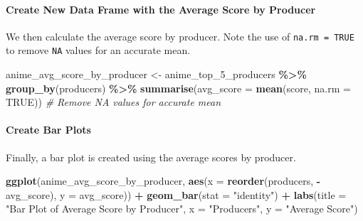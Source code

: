 \documentclass[
  b5paper]{book}
\newenvironment{Shaded}{\begin{snugshade}}{\end{snugshade}}
\newcommand{\AttributeTok}[1]{\textcolor[rgb]{0.13,0.29,0.53}{#1}}
\newcommand{\CommentTok}[1]{\textcolor[rgb]{0.56,0.35,0.01}{\textit{#1}}}
\newcommand{\ConstantTok}[1]{\textcolor[rgb]{0.56,0.35,0.01}{#1}}
\newcommand{\FunctionTok}[1]{\textcolor[rgb]{0.13,0.29,0.53}{\textbf{#1}}}
\newcommand{\NormalTok}[1]{#1}
\newcommand{\OtherTok}[1]{\textcolor[rgb]{0.56,0.35,0.01}{#1}}
\newcommand{\SpecialCharTok}[1]{\textcolor[rgb]{0.81,0.36,0.00}{\textbf{#1}}}
\newcommand{\StringTok}[1]{\textcolor[rgb]{0.31,0.60,0.02}{#1}}
\begin{document}
\hypertarget{create-new-data-frame-with-the-average-score-by-producer}{%
\paragraph*{Create New Data Frame with the Average Score by Producer}\label{create-new-data-frame-with-the-average-score-by-producer}}

We then calculate the average score by producer. Note the use of \texttt{na.rm\ =\ TRUE} to remove \texttt{NA} values for an accurate mean.

\begin{Shaded}
\begin{Highlighting}[]
\NormalTok{anime\_avg\_score\_by\_producer }\OtherTok{\textless{}{-}}\NormalTok{ anime\_top\_5\_producers }\SpecialCharTok{\%\textgreater{}\%}
  \FunctionTok{group\_by}\NormalTok{(producers) }\SpecialCharTok{\%\textgreater{}\%}
  \FunctionTok{summarise}\NormalTok{(}\AttributeTok{avg\_score =} \FunctionTok{mean}\NormalTok{(score, }\AttributeTok{na.rm =} \ConstantTok{TRUE}\NormalTok{))  }\CommentTok{\# Remove NA values for accurate mean}
\end{Highlighting}
\end{Shaded}

\hypertarget{create-bar-plots}{%
\paragraph*{Create Bar Plots}\label{create-bar-plots}}

Finally, a bar plot is created using the average scores by producer.

\begin{Shaded}
\begin{Highlighting}[]
\FunctionTok{ggplot}\NormalTok{(anime\_avg\_score\_by\_producer, }\FunctionTok{aes}\NormalTok{(}\AttributeTok{x =} \FunctionTok{reorder}\NormalTok{(producers, }\SpecialCharTok{{-}}\NormalTok{avg\_score), }\AttributeTok{y =}\NormalTok{ avg\_score)) }\SpecialCharTok{+}
  \FunctionTok{geom\_bar}\NormalTok{(}\AttributeTok{stat =} \StringTok{"identity"}\NormalTok{) }\SpecialCharTok{+}
  \FunctionTok{labs}\NormalTok{(}\AttributeTok{title =} \StringTok{"Bar Plot of Average Score by Producer"}\NormalTok{,}
       \AttributeTok{x =} \StringTok{"Producers"}\NormalTok{,}
       \AttributeTok{y =} \StringTok{"Average Score"}\NormalTok{)}
\end{Highlighting}
\end{Shaded}
\end{document}
